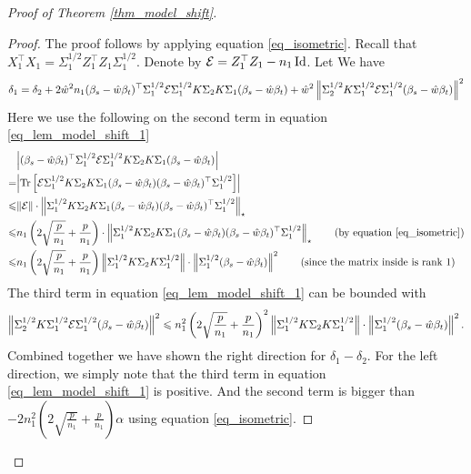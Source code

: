 \begin{proof}[Proof of Theorem \ref{thm_model_shift}]
\begin{proof}
	The proof follows by applying equation \eqref{eq_isometric}.
	Recall that $X_1^{\top}X_1 = \Sigma_1^{1/2}Z_1^{\top}Z_1\Sigma_1^{1/2}$.
	Denote by $\mathcal{E} = Z_1^{\top}Z_1 - {n_1}\operatorname{Id}$.
	Let
	We have
	\begin{align}
		\delta_1 = \delta_2 + {2\hat{w}^2n_1}(\beta_s - \hat{w}\beta_t)^{\top}\Sigma_1^{1/2}\mathcal{E}\Sigma_1^{1/2}K \Sigma_2 K \Sigma_1 (\beta_s - \hat{w}\beta_t)
		+ \hat{w}^2\left\| \Sigma_2^{1/2} K \Sigma_1^{1/2}\mathcal{E} \Sigma_1^{1/2}(\beta_s - \hat{w}\beta_t) \right\|^2 \label{eq_lem_model_shift_1}
	\end{align}
	Here we use the following on the second term in equation \eqref{eq_lem_model_shift_1}
	\begin{align*}
		& \bigabs{(\beta_s - \hat{w}\beta_t)^{\top} \Sigma_1^{1/2} \cE \Sigma_1^{1/2} K \Sigma_2 K \Sigma_1 (\beta_s - \hat{w}\beta_t)} \\
		= & \bigabs{\bigtr{\cE \Sigma_1^{1/2}K\Sigma_2 K \Sigma_1(\beta_s - \hat{w}\beta_t)(\beta_s - \hat{w}\beta_t)^{\top} \Sigma_1^{1/2}}} \\
		\le & \norm{\cE} \cdot \bignormNuclear{\Sigma_1^{1/2} K \Sigma_2 K \Sigma_1 (\beta_s - \hat{w}\beta_t) (\beta_s - \hat{w}\beta_t)^{\top} \Sigma_1^{1/2}} \\
		\le & n_1 \bigbrace{2\sqrt{\frac{p}{n_1}} + \frac{p}{n_1}} \cdot \bignormNuclear{\Sigma_1^{1/2} K \Sigma_2 K \Sigma_1 (\beta_s - \hat{w}\beta_t)(\beta_s - \hat{w}\beta_t)^{\top} \Sigma_1^{1/2}} \tag{by equation \eqref{eq_isometric}} \\
		\le   & n_1 \bigbrace{2\sqrt{\frac{p}{n_1}} + \frac{p}{n_1}} \bignorm{\Sigma_1^{1/2}K \Sigma_2 K \Sigma_1^{1/2}} \cdot \bignorm{\Sigma_1^{1/2}(\beta_s - \hat{w}\beta_t)}^2 \tag{since the matrix inside is rank 1}
	\end{align*}
	The third term in equation \eqref{eq_lem_model_shift_1} can be bounded with
	\begin{align*}
		\left\| \Sigma_2^{1/2}K\Sigma_1^{1/2}\mathcal{E}\Sigma_1^{1/2}(\beta_s - \hat{w}\beta_t) \right\|^2
		\leqslant n_1^2 \left({2\sqrt{\frac{p}{n_1}} + \frac{p}{n_1}}\right)^2 \left\| \Sigma_1^{1/2}K\Sigma_{2}K\Sigma_1^{1/2} \right\| \cdot \left\| \Sigma_1^{1/2}(\beta_s - \hat{w}\beta_t) \right\|^2.
	\end{align*}
	Combined together we have shown the right direction for $\delta_1 - \delta_2$.
	For the left direction, we simply note that the third term in equation \eqref{eq_lem_model_shift_1} is positive.
	And the second term is bigger than $-2n_1^2(2\sqrt{\frac{p}{n_1}} + \frac{p}{n_1}) \alpha$ using equation \eqref{eq_isometric}.
\end{proof}





\end{proof}
